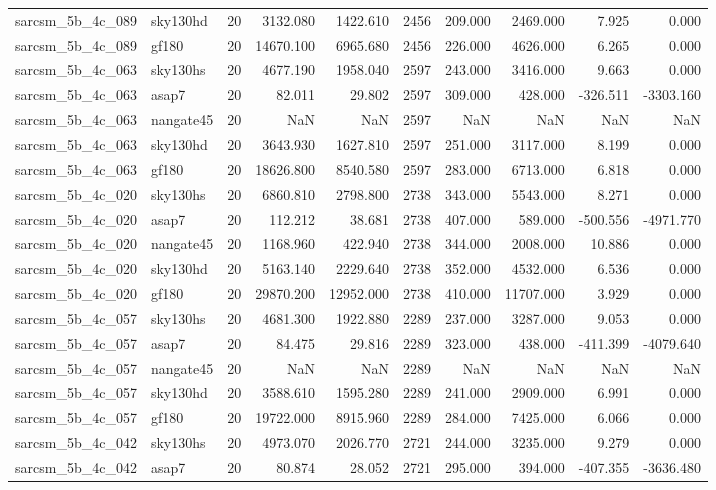 \begin{longtable}{llrrrrrrrr}
sarcsm\_5b\_4c\_089 & sky130hd & 20 & 3132.080 & 1422.610 & 2456 & 209.000 & 2469.000 & 7.925 & 0.000 \\
sarcsm\_5b\_4c\_089 & gf180 & 20 & 14670.100 & 6965.680 & 2456 & 226.000 & 4626.000 & 6.265 & 0.000 \\
sarcsm\_5b\_4c\_063 & sky130hs & 20 & 4677.190 & 1958.040 & 2597 & 243.000 & 3416.000 & 9.663 & 0.000 \\
sarcsm\_5b\_4c\_063 & asap7 & 20 & 82.011 & 29.802 & 2597 & 309.000 & 428.000 & -326.511 & -3303.160 \\
sarcsm\_5b\_4c\_063 & nangate45 & 20 & NaN & NaN & 2597 & NaN & NaN & NaN & NaN \\
sarcsm\_5b\_4c\_063 & sky130hd & 20 & 3643.930 & 1627.810 & 2597 & 251.000 & 3117.000 & 8.199 & 0.000 \\
sarcsm\_5b\_4c\_063 & gf180 & 20 & 18626.800 & 8540.580 & 2597 & 283.000 & 6713.000 & 6.818 & 0.000 \\
sarcsm\_5b\_4c\_020 & sky130hs & 20 & 6860.810 & 2798.800 & 2738 & 343.000 & 5543.000 & 8.271 & 0.000 \\
sarcsm\_5b\_4c\_020 & asap7 & 20 & 112.212 & 38.681 & 2738 & 407.000 & 589.000 & -500.556 & -4971.770 \\
sarcsm\_5b\_4c\_020 & nangate45 & 20 & 1168.960 & 422.940 & 2738 & 344.000 & 2008.000 & 10.886 & 0.000 \\
sarcsm\_5b\_4c\_020 & sky130hd & 20 & 5163.140 & 2229.640 & 2738 & 352.000 & 4532.000 & 6.536 & 0.000 \\
sarcsm\_5b\_4c\_020 & gf180 & 20 & 29870.200 & 12952.000 & 2738 & 410.000 & 11707.000 & 3.929 & 0.000 \\
sarcsm\_5b\_4c\_057 & sky130hs & 20 & 4681.300 & 1922.880 & 2289 & 237.000 & 3287.000 & 9.053 & 0.000 \\
sarcsm\_5b\_4c\_057 & asap7 & 20 & 84.475 & 29.816 & 2289 & 323.000 & 438.000 & -411.399 & -4079.640 \\
sarcsm\_5b\_4c\_057 & nangate45 & 20 & NaN & NaN & 2289 & NaN & NaN & NaN & NaN \\
sarcsm\_5b\_4c\_057 & sky130hd & 20 & 3588.610 & 1595.280 & 2289 & 241.000 & 2909.000 & 6.991 & 0.000 \\
sarcsm\_5b\_4c\_057 & gf180 & 20 & 19722.000 & 8915.960 & 2289 & 284.000 & 7425.000 & 6.066 & 0.000 \\
sarcsm\_5b\_4c\_042 & sky130hs & 20 & 4973.070 & 2026.770 & 2721 & 244.000 & 3235.000 & 9.279 & 0.000 \\
sarcsm\_5b\_4c\_042 & asap7 & 20 & 80.874 & 28.052 & 2721 & 295.000 & 394.000 & -407.355 & -3636.480 \\

\end{longtable}
